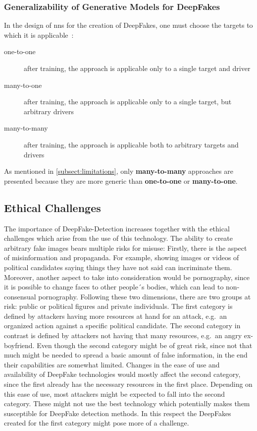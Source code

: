 \subsubsection{Generalizability of Generative Models for DeepFakes}\label{subsubsect:generalizability-deepfakes}
In the design of \glspl{nn} for the creation of DeepFakes, one must choose the
targets to which it is applicable~\cite[cf.][]{Mirsky.2020}:
\begin{description}
    \item[one-to-one] after training, the approach is applicable only to a
    single target and driver
    \item[many-to-one] after training, the approach is applicable only to a
    single target, but arbitrary drivers
    \item[many-to-many] after training, the approach is applicable both to
    arbitrary targets and drivers
\end{description}
As mentioned in \cref{subsect:limitations}, only \textbf{many-to-many} approaches
are presented because they are more generic than \textbf{one-to-one} or
\textbf{many-to-one}.

\subsection{Ethical Challenges}
The importance of DeepFake-Detection increases together with the ethical
challenges which arise from the use of this technology. The ability to create
arbitrary fake images bears multiple risks for misuse: Firstly, there is the
aspect of misinformation and propaganda. For example, showing images or videos
of political candidates saying things they have not said can incriminate
them. Moreover, another aspect to take into consideration would be pornography,
since it is possible to change faces to other people´s bodies, which can lead to
non-consensual pornography. Following these two dimensions, there are two groups
at risk: public or political figures and private individuals. The first category
is defined by attackers having more resources at hand for an attack, e.g.\ an
organized action against a specific political candidate. The second category in 
contrast is defined by attackers not having that many resources, e.g.\ an angry 
ex-boyfriend. Even though the second category might be of great risk, since not 
that much might be needed to spread a basic amount of false information, in the 
end their capabilities are somewhat limited. Changes in the ease of use and 
availability of DeepFake technologies would mostly affect the second category, 
since the first already has the necessary resources in the first place. Depending 
on this ease of use, most attackers might be expected to fall into the second 
category. These might not use the best technology which potentially makes them 
susceptible for DeepFake detection methods. In this respect the DeepFakes created
for the first category might pose more of a challenge.
 